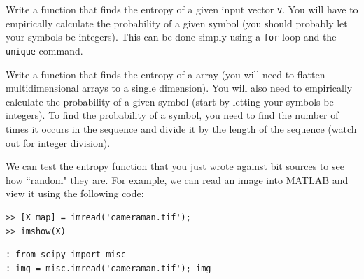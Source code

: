 \begin{problem}
\begin{matlab}Write a function that finds the entropy of a given input vector {\tt v}. You will have to empirically calculate the probability of a given symbol (you should probably let your symbols be integers). This can be done simply using a {\tt for} loop and the {\tt unique} command.\end{matlab}
\begin{python}Write a function that finds the entropy of a array (you will need to flatten multidimensional arrays to a single dimension). You will also need to empirically calculate the probability of a given symbol (start by letting your symbols be integers). To find the probability of a symbol, you need to find the number of times it occurs in the sequence and divide it by the length of the sequence (watch out for integer division).\end{python} 
\end{problem}

We can test the entropy function that you just wrote against bit sources to see how ``random" they are. For example, we can read an image into MATLAB and view it using the following code:
\begin{matlab}
 \begin{lstlisting}[style=python]
>> [X map] = imread('cameraman.tif');
>> imshow(X)
\end{lstlisting}
\end{matlab}
\begin{python}
\begin{lstlisting}[style=python]
: from scipy import misc
: img = misc.imread('cameraman.tif'); img
\end{lstlisting}
\end{python}

